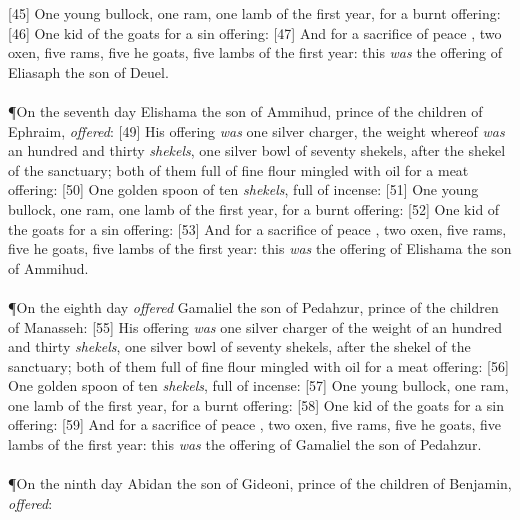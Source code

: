 [45] \textcolor[cmyk]{0.99998,1,0,0}{One young bullock, one ram, one lamb of the first year, for a burnt offering:}
[46] \textcolor[cmyk]{0.99998,1,0,0}{One kid of the goats for a sin offering:}
[47] \textcolor[cmyk]{0.99998,1,0,0}{And for a sacrifice of peace , two oxen, five rams, five he goats, five lambs of the first year: this \emph{was} the offering of Eliasaph the son of Deuel.}\\
\\
\P \textcolor[cmyk]{0.99998,1,0,0}{On the seventh day Elishama the son of Ammihud, prince of the children of Ephraim, \emph{offered}:}
[49] \textcolor[cmyk]{0.99998,1,0,0}{His offering \emph{was} one silver charger, the weight whereof \emph{was} an hundred and thirty \emph{shekels}, one silver bowl of seventy shekels, after the shekel of the sanctuary; both of them full of fine flour mingled with oil for a meat offering:}
[50] \textcolor[cmyk]{0.99998,1,0,0}{One golden spoon of ten \emph{shekels}, full of incense:}
[51] \textcolor[cmyk]{0.99998,1,0,0}{One young bullock, one ram, one lamb of the first year, for a burnt offering:}
[52] \textcolor[cmyk]{0.99998,1,0,0}{One kid of the goats for a sin offering:}
[53] \textcolor[cmyk]{0.99998,1,0,0}{And for a sacrifice of peace , two oxen, five rams, five he goats, five lambs of the first year: this \emph{was} the offering of Elishama the son of Ammihud.}\\
\\
\P \textcolor[cmyk]{0.99998,1,0,0}{On the eighth day \emph{offered} Gamaliel the son of Pedahzur, prince of the children of Manasseh:}
[55] \textcolor[cmyk]{0.99998,1,0,0}{His offering \emph{was} one silver charger of the weight of an hundred and thirty \emph{shekels}, one silver bowl of seventy shekels, after the shekel of the sanctuary; both of them full of fine flour mingled with oil for a meat offering:}
[56] \textcolor[cmyk]{0.99998,1,0,0}{One golden spoon of ten \emph{shekels}, full of incense:}
[57] \textcolor[cmyk]{0.99998,1,0,0}{One young bullock, one ram, one lamb of the first year, for a burnt offering:}
[58] \textcolor[cmyk]{0.99998,1,0,0}{One kid of the goats for a sin offering:}
[59] \textcolor[cmyk]{0.99998,1,0,0}{And for a sacrifice of peace , two oxen, five rams, five he goats, five lambs of the first year: this \emph{was} the offering of Gamaliel the son of Pedahzur.}\\
\\
\P \textcolor[cmyk]{0.99998,1,0,0}{On the ninth day Abidan the son of Gideoni, prince of the children of Benjamin, \emph{offered}:}
